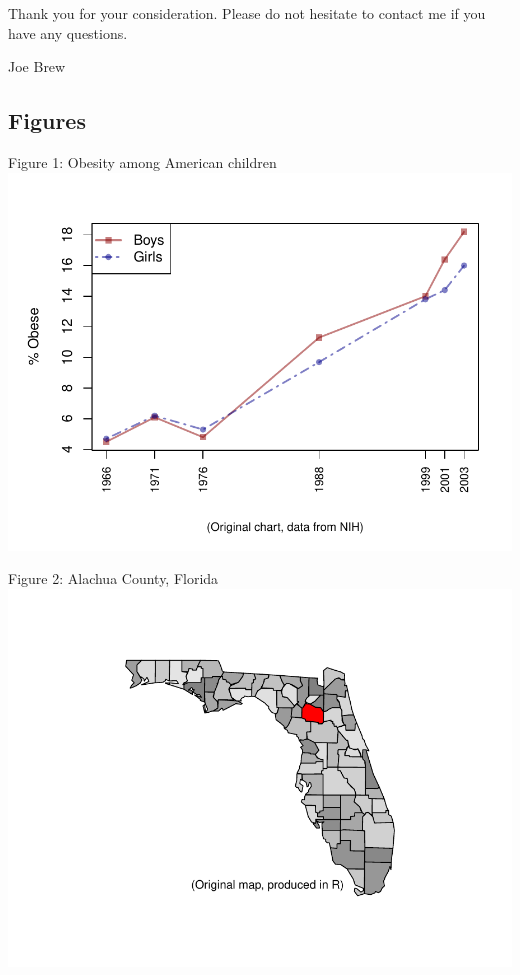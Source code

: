 \documentclass[11pt]{article}
\begin{document}
\vspace{3mm}

\noindent Thank you for your consideration.  Please do not hesitate to contact me if you have any questions.
\vspace{5mm}

\noindent Joe Brew

\subsection*{Figures}
\begin{center}
Figure 1: Obesity among American children\cite{NIH}
\includegraphics{loi-001}
\end{center}


\begin{center}
Figure 2: Alachua County, Florida\cite{maps}
\includegraphics{loi-002}
\end{center}


\end{document}
